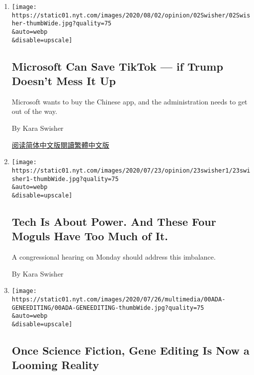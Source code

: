 \begin{enumerate}
\def\labelenumi{\arabic{enumi}.}
\item
  \href{/2020/08/02/opinion/02tik-tok-china-trump.html}{}

  \texttt{[image: https://static01.nyt.com/images/2020/08/02/opinion/02Swisher/02Swisher-thumbWide.jpg?quality=75\\\&auto=webp\\\&disable=upscale]}

  \hypertarget{microsoft-can-save-tiktok--if-trump-doesnt-mess-it-up}{%
  \subsection{Microsoft Can Save TikTok --- if Trump Doesn't Mess It
  Up}\label{microsoft-can-save-tiktok--if-trump-doesnt-mess-it-up}}

  Microsoft wants to buy the Chinese app, and the administration needs
  to get out of the way.

  By Kara Swisher

  \href{https://cn.nytimes.com/opinion/20200804/tik-tok-china-trump/}{阅读简体中文版}\href{https://cn.nytimes.com/opinion/20200804/tik-tok-china-trump/zh-hant/}{閱讀繁體中文版}
\item
  \href{/2020/07/23/opinion/tech-moguls-congressional-hearing.html}{}

  \texttt{[image: https://static01.nyt.com/images/2020/07/23/opinion/23swisher1/23swisher1-thumbWide.jpg?quality=75\\\&auto=webp\\\&disable=upscale]}

  \hypertarget{tech-is-about-power-and-these-four-moguls-have-too-much-of-it}{%
  \subsection{Tech Is About Power. And These Four Moguls Have Too Much
  of
  It.}\label{tech-is-about-power-and-these-four-moguls-have-too-much-of-it}}

  A congressional hearing on Monday should address this imbalance.

  By Kara Swisher
\item
  \href{/2020/07/22/style/crispr-gene-editing-ethics.html}{}

  \texttt{[image: https://static01.nyt.com/images/2020/07/26/multimedia/00ADA-GENEEDITING/00ADA-GENEEDITING-thumbWide.jpg?quality=75\\\&auto=webp\\\&disable=upscale]}

  \hypertarget{once-science-fiction-gene-editing-is-now-a-looming-reality}{%
  \subsection{Once Science Fiction, Gene Editing Is Now a Looming
  Reality}\label{once-science-fiction-gene-editing-is-now-a-looming-reality}}


\end{enumerate}
